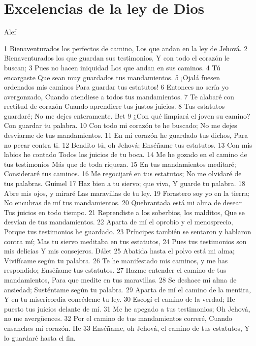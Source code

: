 \section*{Excelencias de la ley de Dios}

Alef

1 Bienaventurados los perfectos de camino,
Los que andan en la ley de Jehová.
2 Bienaventurados los que guardan sus testimonios,
Y con todo el corazón le buscan;
3 Pues no hacen iniquidad
Los que andan en sus caminos.
4 Tú encargaste
Que sean muy guardados tus mandamientos.
5 ¡Ojalá fuesen ordenados mis caminos
Para guardar tus estatutos!
6 Entonces no sería yo avergonzado,
Cuando atendiese a todos tus mandamientos.
7 Te alabaré con rectitud de corazón
Cuando aprendiere tus justos juicios.
8 Tus estatutos guardaré;
No me dejes enteramente.
Bet
9 ¿Con qué limpiará el joven su camino?
Con guardar tu palabra.
10 Con todo mi corazón te he buscado;
No me dejes desviarme de tus mandamientos.
11 En mi corazón he guardado tus dichos,
Para no pecar contra ti.
12 Bendito tú, oh Jehová;
Enséñame tus estatutos.
13 Con mis labios he contado
Todos los juicios de tu boca.
14 Me he gozado en el camino de tus testimonios
Más que de toda riqueza.
15 En tus mandamientos meditaré;
Consideraré tus caminos.
16 Me regocijaré en tus estatutos;
No me olvidaré de tus palabras.
Guímel
17 Haz bien a tu siervo; que viva,
Y guarde tu palabra.
18 Abre mis ojos, y miraré
Las maravillas de tu ley.
19 Forastero soy yo en la tierra;
No encubras de mí tus mandamientos.
20 Quebrantada está mi alma de desear
Tus juicios en todo tiempo.
21 Reprendiste a los soberbios, los malditos,
Que se desvían de tus mandamientos.
22 Aparta de mí el oprobio y el menosprecio,
Porque tus testimonios he guardado.
23 Príncipes también se sentaron y hablaron contra mí;
Mas tu siervo meditaba en tus estatutos,
24 Pues tus testimonios son mis delicias
Y mis consejeros.
Dálet
25 Abatida hasta el polvo está mi alma;
Vivifícame según tu palabra.
26 Te he manifestado mis caminos, y me has respondido;
Enséñame tus estatutos.
27 Hazme entender el camino de tus mandamientos,
Para que medite en tus maravillas.
28 Se deshace mi alma de ansiedad;
Susténtame según tu palabra.
29 Aparta de mí el camino de la mentira,
Y en tu misericordia concédeme tu ley.
30 Escogí el camino de la verdad;
He puesto tus juicios delante de mí.
31 Me he apegado a tus testimonios;
Oh Jehová, no me avergüences.
32 Por el camino de tus mandamientos correré,
Cuando ensanches mi corazón.
He
33 Enséñame, oh Jehová, el camino de tus estatutos,
Y lo guardaré hasta el fin.
